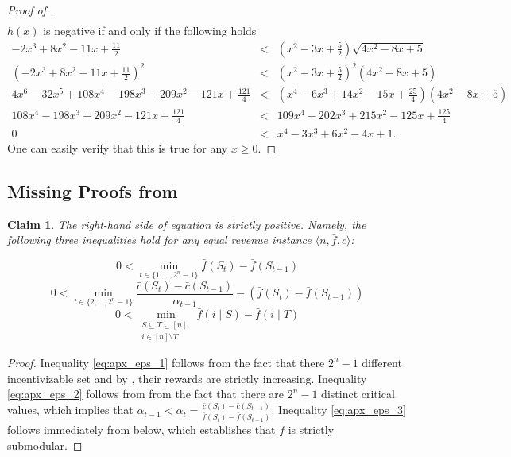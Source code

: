 \documentclass[11pt]{article}
\newtheorem{claim}{Claim}
\newcommand{\feq}{\bar{f}}
\newcommand{\ceq}{\bar{c}}
\newcommand{\eqRevInst}{\langle n,\feq,\ceq \rangle}
\begin{document}
\begin{proof}[Proof of ]
\begin{eqnarray*}
    \end{eqnarray*}
   $h(x)$ is negative if and only if the following holds
   \begin{eqnarray*}
       -2x^3+8x^2-11x+\frac{11}{2}
       &<&
       \left(x^2-3x+\frac{5}{2}\right)\sqrt{4x^2-8x+5} \\
       \left(-2x^3+8x^2-11x+\frac{11}{2}\right)^2
       &<&
       \left(x^2-3x+\frac{5}{2}\right)^2(4x^2-8x+5) \\
      4x^6 - 32x^5 + 108x^4 -198x^3 + 209x^2 - 121x + \frac{121}{4}
      &<&
      \left(x^4-6x^3+14x^2-15x+\frac{25}{4}\right)(4x^2-8x+5) \\
      108x^4 -198x^3 + 209x^2 - 121x + \frac{121}{4}
      &<&
      109x^4 -202x^3 + 215x^2 - 125x + \frac{125}{4} \\
      0
      &<&
      x^4 -3x^3 + 6x^2 - 4x + 1.
   \end{eqnarray*}
   One can easily verify that this is true for any $x \ge 0$.
\end{proof}


\subsection{Missing Proofs from }\label{apx:proofs_family_equalRev}

\begin{claim}\label{cla:eps_0_positive}
    The right-hand side of equation  is strictly positive. Namely, the following three inequalities hold for any equal revenue instance $\eqRevInst$:
    
\begin{equation}\label{eq:apx_eps_1}
0< \min_{t \in \{1,\dots,2^n-1\}} \feq(S_{t})-\feq(S_{t-1}) 
\end{equation}
\begin{equation}\label{eq:apx_eps_2}
    0 < \min_{t \in \{2,\dots,2^n-1\}} \frac{\ceq(S_t) - \ceq(S_{t-1})}{\alpha_{t-1}} - (\feq(S_t) - \feq(S_{t-1}))
\end{equation}
\begin{equation}\label{eq:apx_eps_3}
    0 < \min_{\substack{S \subseteq T \subseteq [n], \\ i \in [n]\setminus T}} \feq(i \mid S) - \feq(i \mid T)
\end{equation}
\end{claim}

\begin{proof}
Inequality \ref{eq:apx_eps_1} follows from the fact that there $2^n-1$ different incentivizable set and by , their rewards are strictly increasing.
Inequality \ref{eq:apx_eps_2} follows from from the fact that there are $2^n-1$ distinct critical values, which implies that $\alpha_{t-1} < \alpha_t = \frac{\ceq(S_t) - \ceq(S_{t-1})}{\feq(S_t) - \feq(S_{t-1})}$. 
Inequality \ref{eq:apx_eps_3} follows immediately from  below, which establishes that $\feq$ is strictly submodular.
\end{proof}
\end{document}

